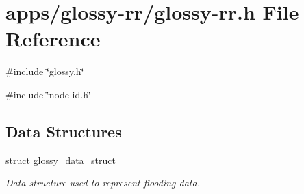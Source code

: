 \hypertarget{glossy-rr_8h}{
\section{apps/glossy-\/rr/glossy-\/rr.h File Reference}
\label{glossy-rr_8h}
}
{\ttfamily \#include \char`\"{}glossy.h\char`\"{}}\par
{\ttfamily \#include \char`\"{}node-\/id.h\char`\"{}}\par
\subsection*{Data Structures}
\begin{DoxyCompactItemize}
\item 
struct \hyperlink{structglossy__data__struct}{glossy\_\-data\_\-struct}
\begin{DoxyCompactList}\small\item\em Data structure used to represent flooding data. \end{DoxyCompactList}\end{DoxyCompactItemize}

